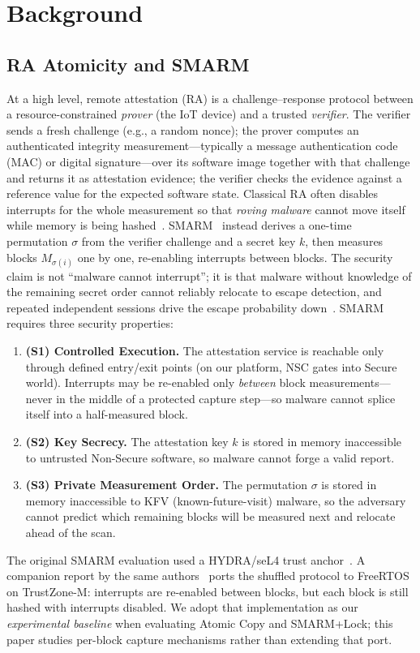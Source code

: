 \documentclass[conference]{IEEEtran}
\newcommand{\smarmlock}{SMARM+Lock\xspace}
\begin{document}
\section{Background}
\label{sec:background}

\subsection{RA Atomicity and SMARM}
At a high level, remote attestation (RA) is a challenge--response
protocol between a resource-constrained \emph{prover} (the IoT device)
and a trusted \emph{verifier}.
The verifier sends a fresh challenge (e.g., a random nonce); the prover
computes an authenticated integrity measurement---typically a message
authentication code (MAC) or digital signature---over its software image
together with that challenge and returns it as attestation evidence; the
verifier checks the evidence against a reference value for the expected
software state.
Classical RA often disables interrupts for the whole measurement so that
\emph{roving malware} cannot move itself while memory is being
hashed~\cite{eldefrawy2012smart,nunes2019vrased}.
SMARM~\cite{carpent2018smarm} instead derives a one-time permutation
$\sigma$ from the verifier challenge and a secret key $k$, then measures
blocks $M_{\sigma(i)}$ one by one, re-enabling interrupts between
blocks. The security claim is not ``malware cannot interrupt''; it is
that malware without knowledge of the remaining secret order cannot
reliably relocate to escape detection, and repeated independent sessions
drive the escape probability down~\cite{carpent2018smarm}.
SMARM requires three security properties:
\begin{enumerate}
  \item \textbf{(S1) Controlled Execution.}
    The attestation service is reachable only through defined
    entry/exit points (on our platform, NSC gates into Secure
    world). Interrupts may be re-enabled only
    \emph{between} block measurements---never in the middle of a
    protected capture step---so malware cannot splice itself into a
    half-measured block.
  \item \textbf{(S2) Key Secrecy.}
    The attestation key $k$ is stored in memory inaccessible to
    untrusted Non-Secure software, so malware cannot forge a valid
    report.
  \item \textbf{(S3) Private Measurement Order.}
    The permutation $\sigma$ is stored in memory inaccessible to
    KFV (known-future-visit) malware, so the adversary cannot
    predict which remaining blocks will be measured next and relocate
    ahead of the scan.
\end{enumerate}
The original SMARM evaluation used a HYDRA/seL4 trust
anchor~\cite{eldefrawy2017hydra,carpent2018smarm}.
A companion report by the same authors~\cite{smarmplus2026} ports the
shuffled protocol to FreeRTOS on TrustZone-M: interrupts are re-enabled
between blocks, but each block is still hashed with interrupts disabled.
We adopt that implementation as our \emph{experimental baseline} when
evaluating Atomic Copy and \smarmlock{}; this paper studies per-block
capture mechanisms rather than extending that port.
\end{document}
